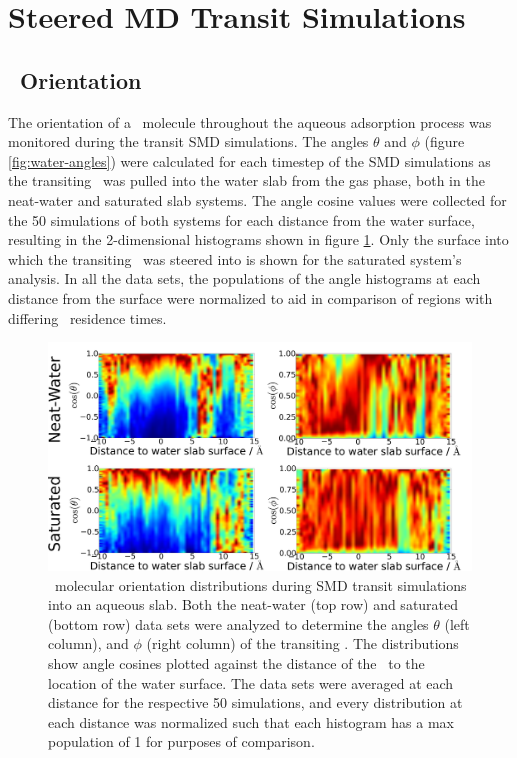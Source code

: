 \section{Steered MD Transit Simulations}

\subsection {\suldiox~Orientation}

	The orientation of a \suldiox~molecule throughout the aqueous adsorption process was monitored during the transit SMD simulations. The angles $\theta$ and $\phi$ (figure \ref{fig:water-angles}) were calculated for each timestep of the SMD simulations as the transiting \suldiox~was pulled into the water slab from the gas phase, both in the neat-water and saturated slab systems. The angle cosine values were collected for the 50 simulations of both systems for each distance from the water surface, resulting in the 2-dimensional histograms shown in figure \ref{fig:so2-transit-angles}. Only the surface into which the transiting \suldiox~was steered into is shown for the saturated system's analysis. In all the data sets, the populations of the angle histograms at each distance from the surface were normalized to aid in comparison of regions with differing \suldiox~residence times.

\begin{figure}[h!]
	\begin{center}
		\includegraphics[scale=1.0]{images/transit-so2-angles/so2-angles-transit.png}
		\caption{\suldiox~molecular orientation distributions during SMD transit simulations into an aqueous slab. Both the neat-water (top row) and saturated (bottom row) data sets were analyzed to determine the angles $\theta$ (left column), and $\phi$ (right column) of the transiting \suldiox. The distributions show angle cosines plotted against the distance of the \suldiox~to the location of the water surface. The data sets were averaged at each distance for the respective 50 simulations, and every distribution at each distance was normalized such that each histogram has a max population of 1 for purposes of comparison.}
		\label{fig:so2-transit-angles}
	\end{center}
\end{figure}

